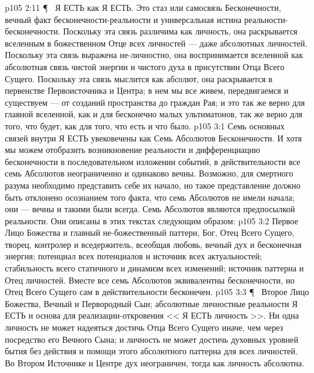 \vs p105 2:11 \P\ \bibnobreakspace {} Я ЕСТЬ как Я ЕСТЬ. Это стаз или самосвязь Бесконечности, вечный факт бесконечности\hyp{}реальности и универсальная истина реальности\hyp{}бесконечности. Поскольку эта связь различима как личность, она раскрывается вселенным в божественном Отце всех личностей --- даже абсолютных личностей. Поскольку эта связь выражена не\hyp{}личностно, она воспринимается вселенной как абсолютная связь чистой энергии и чистого духа в присутствии Отца Всего Сущего. Поскольку эта связь мыслится как абсолют, она раскрывается в первенстве Первоисточника и Центра; в нем мы все живем, передвигаемся и существуем --- от созданий пространства до граждан Рая; и это так же верно для главной вселенной, как и для бесконечно малых ультиматонов, так же верно для того, что будет, как для того, что есть и что было.
\vs p105 3:1 Семь основных связей внутри Я ЕСТЬ увековечены как Семь Абсолютов Бесконечности. И хотя мы можем отобразить возникновение реальности и дифференциацию бесконечности в последовательном изложении событий, в действительности все семь Абсолютов неограниченно и одинаково вечны. Возможно, для смертного разума необходимо представить себе их начало, но такое представление должно быть отклонено осознанием того факта, что семь Абсолютов не имели начала; они --- вечны и такими были всегда. Семь Абсолютов являются предпосылкой реальности. Они описаны в этих текстах следующим образом:
\vs p105 3:2 \bibnobreakspace {} Первое Лицо Божества и главный не\hyp{}божественный паттерн, Бог, Отец Всего Сущего, творец, контролер и вседержитель, всеобщая любовь, вечный дух и бесконечная энергия; потенциал всех потенциалов и источник всех актуальностей; стабильность всего статичного и динамизм всех изменений; источник паттерна и Отец личностей. Вместе все семь Абсолютов эквивалентны бесконечности, но Отец Всего Сущего сам в действительности бесконечен.
\vs p105 3:3 \P\ \bibnobreakspace {} Второе Лицо Божества, Вечный и Первородный Сын; абсолютные личностные реальности Я ЕСТЬ и основа для реализации\hyp{}откровения << Я ЕСТЬ личность >>. Ни одна личность не может надеяться достичь Отца Всего Сущего иначе, чем через посредство его Вечного Сына; и личность не может достичь духовных уровней бытия без действия и помощи этого абсолютного паттерна для всех личностей. Во Втором Источнике и Центре дух неограничен, тогда как личность абсолютна.
